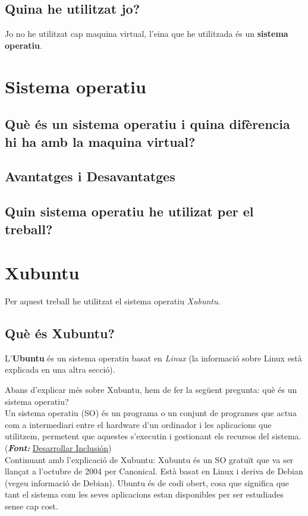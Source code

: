 \subsection{Quina he utilitzat jo?}
Jo no he utilitzat cap maquina virtual, l'eina que he utilitzada és un \textbf{sistema operatiu}.

\section{Sistema operatiu}
\subsection{Què és un sistema operatiu i quina difèrencia hi ha amb la maquina virtual?}
\subsection{Avantatges i Desavantatges}
\subsection{Quin sistema operatiu he utilizat per el treball?}
\section{Xubuntu}
Per aquest treball he utilitzat el sistema operatiu \textit{Xubuntu}\cite{xubuntu}.
\subsection{Què és Xubuntu?}
L’\textbf{Ubuntu} és un sistema operatiu basat en \textit{Linux} (la informació sobre Linux està explicada en una altra secció).

Abans d’explicar més sobre Xubuntu, hem de fer la següent pregunta: què és un sistema operatiu? \\

Un sistema operatiu (SO) és un programa o un conjunt de programes que actua com a intermediari entre el hardware d’un ordinador i les aplicacions que utilitzem, permetent que aquestes s’executin i gestionant els recursos del sistema. (\textit{\textbf{Font:}} \href{https://desarrollarinclusion.cilsa.org/tecnologia-inclusiva/que-es-un-sistema-operativo/#:~:text=Un\%20sistema\%20operativo\%20es\%20un,placa\%20de\%20red\%2C\%20entre\%20otros.}{Desarrollar Inclusión}) \\

Continuant amb l’explicació de Xubuntu: Xubuntu és un SO gratuït que va ser llançat a l’octubre de 2004 per Canonical. Està basat en Linux i deriva de Debian (vegeu informació de Debian). Ubuntu és de codi obert, cosa que significa que tant el sistema com les seves aplicacions estan disponibles per ser estudiades sense cap cost.

